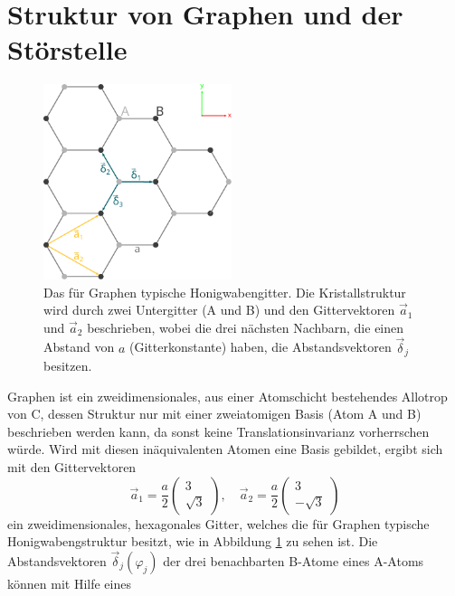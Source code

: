 \section{Struktur von Graphen und der Störstelle}
\label{sec:structure}
\begin{figure}
    \centering
    \includegraphics[width = 0.49\textwidth]{Plots/graphene_lattice.pdf}
    \caption{Das für Graphen typische Honigwabengitter. Die Kristallstruktur wird durch zwei Untergitter (A und B) und den 
    Gittervektoren $\vec{a}_1$ und $\vec{a}_2$ beschrieben, wobei
    die drei nächsten Nachbarn, die einen Abstand von $a$ (Gitterkonstante) haben, die Abstandsvektoren $\vec{\delta}_j$ besitzen.}
    \label{fig:graphene_lattice}
\end{figure}
Graphen ist ein zweidimensionales, aus einer Atomschicht bestehendes Allotrop von C, dessen
Struktur nur mit einer zweiatomigen Basis (Atom A und B) beschrieben werden kann, da sonst keine Translationsinvarianz vorherrschen würde.
Wird mit diesen inäquivalenten Atomen eine Basis gebildet, ergibt sich mit den Gittervektoren 
\begin{equation*}
        \vec{a}_1 = \frac{a}{2}\begin{pmatrix} 3 \\[4pt] \sqrt{3}  \end{pmatrix}, \quad
        \vec{a}_2 = \frac{a}{2}\begin{pmatrix} 3 \\[4pt] -\sqrt{3} \end{pmatrix}       
\end{equation*}    
ein zweidimensionales, hexagonales Gitter, welches die für Graphen typische Honigwabengstruktur besitzt,
wie in Abbildung \ref{fig:graphene_lattice} zu sehen ist.
Die Abstandsvektoren $\vec{\delta}_j(\varphi_j)$ der drei benachbarten B-Atome eines A-Atoms können mit Hilfe eines 
